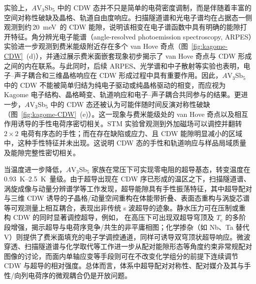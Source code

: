 实验上，$A$V$_3$Sb$_5$ 中的 CDW 态并不只是简单的电荷密度调制，而是伴随着丰富的空间对称性破缺及晶格、轨道自由度响应。扫描隧道谱\cite{jiang2021unconventional,chen2021roton,wang2021charge}和光电子谱\cite{nakayama2022richvanhove,luo2022surfaceorbitalselective,kang2022twofoldvanhove,huElectroniclandscapekagome2023}均在占据态一侧观测到约\,\qty{20}{\milli\electronvolt}~的 CDW 能隙，说明该相变在电子谱函数中具有明确的能隙打开特征。角分辨光电子能谱（angle-resolved photoemission spectroscopy, ARPES）实验进一步观测到费米能级附近存在多个 van Hove 奇点（图~\ref{fig:kagome-CDW}~(d)）\cite{huRichnatureVan2022}，并通过展示费米面嵌套现象初步揭示了 van Hove 奇点与 CDW 形成之间的内在联系。与此同时，后续 ARPES、光学谱和中子散射等实验也表明，电子--声子耦合和三维晶格响应在 CDW 形成过程中具有重要作用\cite{neupert2022charge}。因此，$A$V$_3$Sb$_5$ 中的 CDW 不能被简单归结为纯电子驱动或纯晶格驱动的相变，而应视为 Kagome 电子结构、晶格畸变、轨道响应和电子--声子耦合共同参与的结果。更进一步，$A$V$_3$Sb$_5$ 中的 CDW 态还被认为可能伴随时间反演对称性破缺（图~\ref{fig:kagome-CDW}~(e)）\cite{mielke2022time}。这一现象与费米能级处的 van Hove 奇点以及相互作用诱导的手性电荷序密切相关\cite{nie2022charge,neupert2022charge}。STM 实验曾观测到外加磁场可以调控并翻转 $2\times2$ 电荷有序态的手性\cite{jiang2021unconventional,wang2021charge,shumiya2021intrinsicchiralRbV3Sb5}；而在存在缺陷或应力、且 CDW 能隙明显减小的区域中，这种手性特征并未出现\cite{jiang2021unconventional,li2022rotationsymmetryKV3Sb5,shumiya2021intrinsicchiralRbV3Sb5,wang2021charge}。这说明 CDW 态的手性和轨道响应与样品局域质量及能隙完整性密切相关。

当温度进一步降低，$A$V$_3$Sb$_5$ 家族在常压下可实现零电阻的超导基态，转变温度在\,\qtyrange{0.93}{2.5}{\kelvin}~量级\cite{ortiz2020cs,yin2021rbv3sb5,ortiz2021superconductivity}。由于超导出现在 CDW 序已形成的温区之下，扫描隧道谱、涡旋成像与动量分辨谱学等工作发现，超导能隙具有手性振荡特征，其中超导配对与三维 CDW 诱导的子晶格/动量空间重构在体能带折叠、表面态重构与涡旋芯谱等可观测量上相互耦合\cite{liang2021three,zhao2021cascade,huElectroniclandscapekagome2023}，表现出非传统 s 波超导的迹象。静水压力可在压制或重构 CDW 的同时显著调控超导，例如， 在高压下可出现双超导穹顶及 $T_\mathrm{c}$ 的多阶段增强，揭示超导与电荷序竞争/共生的非平庸相图\cite{chen2021double,wang2021charge,zhengEmergentchargeorder2022}；化学掺杂（如 Nb、Ta 替代 V）则提供了费米面填充的电子学调控通道，同样可诱导双穹顶状超导响应\cite{oey2022fermileveltuning}。微波穿透、扫描隧道谱与化学取代等工作进一步从配对能隙形态等角度约束非常规配对图像的讨论\cite{zhongNodelesselectronpairing2023}，而面内单轴应变等手段则可在不改变化学组分的前提下连续调节 CDW 与超导的相对强度\cite{li2022uniaxialstrainCSV3Sb5}。总体而言，体系中超导配对对称性、配对媒介及其与手性/向列电荷序的微观耦合仍是开放问题\cite{neupert2022charge,huElectroniclandscapekagome2023}。

